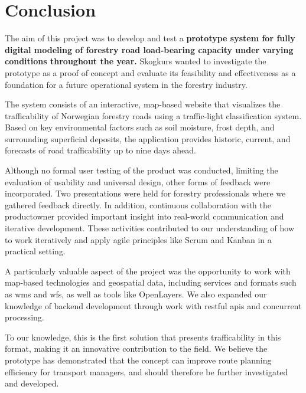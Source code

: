 \chapter{Conclusion}\label{chap:conclusion}

The aim of this project was to develop and test a \textbf{prototype system for fully digital modeling of forestry road load-bearing capacity under varying conditions throughout the year.} Skogkurs wanted to investigate the prototype as a proof of concept and evaluate its feasibility and effectiveness as a foundation for a future operational system in the forestry industry. 

The system consists of an interactive, map-based website that visualizes the trafficability of Norwegian forestry roads using a traffic-light classification system. Based on key environmental factors such as soil moisture, frost depth, and surrounding superficial deposits, the application provides historic, current, and forecasts of road trafficability up to nine days ahead.

Although no formal user testing of the product was conducted, limiting the evaluation of usability and universal design, other forms of feedback were incorporated. Two presentations were held for forestry professionals where we gathered feedback directly. In addition, continuous collaboration with the \gls{productowner} provided important insight into real-world communication and iterative development. These activities contributed to our understanding of how to work iteratively and apply agile principles like Scrum and Kanban in a practical setting.

A particularly valuable aspect of the project was the opportunity to work with map-based technologies and geospatial data, including services and formats such as \gls{wms} and \gls{wfs}, as well as tools like OpenLayers. We also expanded our knowledge of backend development through work with \acrshort{rest}ful \acrshort{api}s and concurrent processing.

To our knowledge, this is the first solution that presents trafficability in this format, making it an innovative contribution to the field. We believe the prototype has demonstrated that the concept can improve route planning efficiency for transport managers, and should therefore be further investigated and developed.
